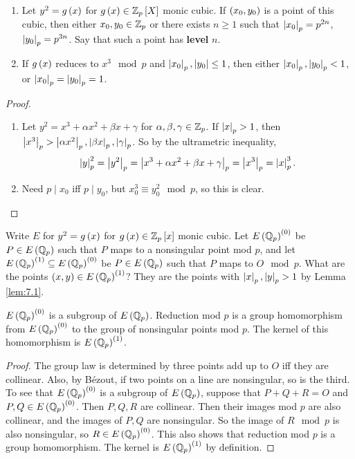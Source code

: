 \begin{lemma}
\label{lem:7.1}
\hfill
\begin{enumerate}
\item Let $ y^2 = g\left( x \right) $ for $ g\left( x \right) \in \mathbb{Z}_p\left[ X \right] $ monic cubic. If $ \left( x_0, y_0 \right) $ is a point of this cubic, then either $ x_0, y_0 \in \mathbb{Z}_p $ or there exists $ n \ge 1 $ such that $ \left\lvert x_0 \right\rvert_p = p^{2n} $, $ \left\lvert y_0 \right\rvert_p = p^{3n} $. Say that such a point has \textbf{level} $ n $.
\item If $ g\left( x \right) $ reduces to $ x^3 \mod p $ and $ \left\lvert x_0 \right\rvert_p, \left\lvert y_0 \right\rvert \le 1 $, then either $ \left\lvert x_0 \right\rvert_p, \left\lvert y_0 \right\rvert_p < 1 $, or $ \left\lvert x_0 \right\rvert_p = \left\lvert y_0 \right\rvert_p = 1 $.
\end{enumerate}
\end{lemma}

\begin{proof}
\hfill
\begin{enumerate}
\item Let $ y^2 = x^3 + \alpha x^2 + \beta x + \gamma $ for $ \alpha, \beta, \gamma \in \mathbb{Z}_p $. If $ \left\lvert x \right\rvert_p > 1 $, then $ \left\lvert x^3 \right\rvert_p > \left\lvert \alpha x^2 \right\rvert_p, \left\lvert \beta x \right\rvert_p, \left\lvert \gamma \right\rvert_p $. So by the ultrametric inequality,
$$ \left\lvert y \right\rvert_p^2 = \left\lvert y^2 \right\rvert_p = \left\lvert x^3 + \alpha x^2 + \beta x + \gamma \right\rvert_p = \left\lvert x^3 \right\rvert_p = \left\lvert x \right\rvert_p^3. $$
\item Need $ p \mid x_0 $ iff $ p \mid y_0 $, but $ x_0^3 \equiv y_0^2 \mod p $, so this is clear.
\end{enumerate}
\end{proof}

Write $ E $ for $ y^2 = g\left( x \right) $ for $ g\left( x \right) \in \mathbb{Z}_p\left[ x \right] $ monic cubic. Let $ E\left( \mathbb{Q}_p \right)^{\left( 0 \right)} $ be $ P \in E\left( \mathbb{Q}_p \right) $ such that $ P $ maps to a nonsingular point mod $ p $, and let $ E\left( \mathbb{Q}_p \right)^{\left( 1 \right)} \subseteq E\left( \mathbb{Q}_p \right)^{\left( 0 \right)} $ be $ P \in E\left( \mathbb{Q}_p \right) $ such that $ P $ maps to $ O \mod p $. What are the points $ \left( x, y \right) \in E\left( \mathbb{Q}_p \right)^{\left( 1 \right)} $? They are the points with $ \left\lvert x \right\rvert_p, \left\lvert y \right\rvert_p > 1 $ by Lemma \ref{lem:7.1}.

\begin{lemma}
\label{lem:7.2}
$ E\left( \mathbb{Q}_p \right)^{\left( 0 \right)} $ is a subgroup of $ E\left( \mathbb{Q}_p \right) $. Reduction mod $ p $ is a group homomorphism from $ E\left( \mathbb{Q}_p \right)^{\left( 0 \right)} $ to the group of nonsingular points mod $ p $. The kernel of this homomorphism is $ E\left( \mathbb{Q}_p \right)^{\left( 1 \right)} $.
\end{lemma}

\begin{proof}
The group law is determined by three points add up to $ O $ iff they are collinear. Also, by Bézout, if two points on a line are nonsingular, so is the third. To see that $ E\left( \mathbb{Q}_p \right)^{\left( 0 \right)} $ is a subgroup of $ E\left( \mathbb{Q}_p \right) $, suppose that $ P + Q + R = O $ and $ P, Q \in E\left( \mathbb{Q}_p \right)^{\left( 0 \right)} $. Then $ P, Q, R $ are collinear. Then their images mod $ p $ are also collinear, and the images of $ P, Q $ are nonsingular. So the image of $ R \mod p $ is also nonsingular, so $ R \in E\left( \mathbb{Q}_p \right)^{\left( 0 \right)} $. This also shows that reduction mod $ p $ is a group homomorphism. The kernel is $ E\left( \mathbb{Q}_p \right)^{\left( 1 \right)} $ by definition.
\end{proof}

